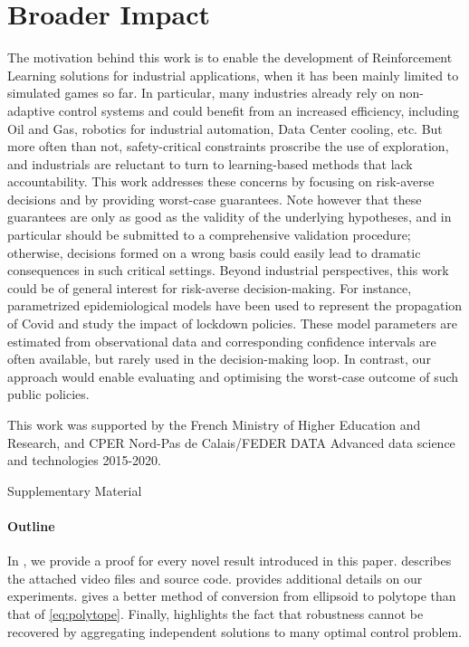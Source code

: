 \documentclass{article}
\begin{document}
\clearpage


\section*{Broader Impact}

The motivation behind this work is to enable the development of Reinforcement Learning solutions for industrial applications, when it has been mainly limited to simulated games so far. In particular, many industries already rely on non-adaptive control systems and could benefit from an increased efficiency, including Oil and Gas, robotics for industrial automation, Data Center cooling, etc. But more often than not, safety-critical constraints proscribe the use of exploration, and industrials are reluctant to turn to learning-based methods that lack accountability. This work addresses these concerns by focusing on risk-averse decisions and by providing worst-case guarantees. Note however that these guarantees are only as good as the validity of the underlying hypotheses, and  in particular should be submitted to a comprehensive validation procedure; otherwise, decisions formed on a wrong basis could easily lead to dramatic consequences in such critical settings.
Beyond industrial perspectives, this work could be of general interest for risk-averse decision-making. For instance, parametrized epidemiological models have been used to represent the propagation of Covid and study the impact of lockdown policies. These model parameters are estimated from observational data and corresponding confidence intervals are often available, but rarely used in the decision-making loop. In contrast, our approach would enable evaluating and optimising the worst-case outcome of such public policies.


\begin{ack}
	This work was supported by the French Ministry of Higher Education and Research, and CPER Nord-Pas de Calais/FEDER DATA Advanced data science and technologies 2015-2020.
\end{ack}




\clearpage
\onecolumn
\appendix

\begin{center}
	\LARGE Supplementary Material
\end{center}

\paragraph{Outline}
In , we provide a proof for every novel result introduced in this paper.  describes the attached video files and source code.  provides additional details on our experiments.  gives a better method of conversion from ellipsoid to polytope than that of \eqref{eq:polytope}. Finally,  highlights the fact that robustness cannot be recovered by aggregating independent solutions to many optimal control problem. 
\end{document}
